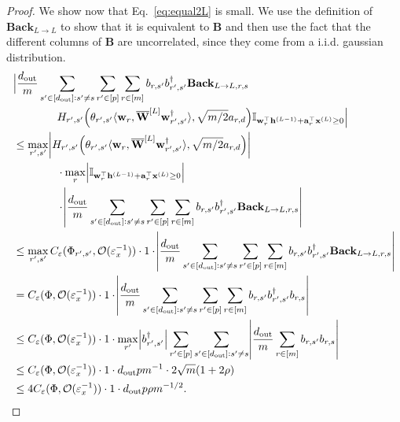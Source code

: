 \begin{proof}
			We show now that Eq.~\ref{eq:equal2L}  is small. We use the definition of $\mathbf{Back}_{L \to L}$ to show that it is equivalent to $\mathbf{B}$ and then use the fact that the different columns of $\mathbf{B}$ are uncorrelated, since they come from a i.i.d. gaussian distribution.
			\begingroup
			\allowdisplaybreaks
			\begin{align*}
				&\Big|\frac{\dout }{m}   \sum_{s' \in [\dout ]: s' \ne s} \sum_{r' \in [p]} \sum_{r \in [m]}  b_{r, s'} b_{r', s'}^{\dagger} \mathbf{Back}_{L \to L, r, s} \\& \quad \quad \quad \quad H_{r', s'}\Big(\theta_{r', s'} \langle \mathbf{w}_{r}, \overline{\mathbf{W}}^{[L]} \mathbf{w}_{r', s'}^{\dagger}\rangle , \sqrt{m/2} a_{r, d}\Big) \mathbb{I}_{\mathbf{w}_r^{\top} \mathbf{h}^{(L-1)} + \mathbf{a}_r^{\top} \mathbf{x}^{(L)} \ge 0}\Big|
				\\& \le \max_{r', s'} \abs{H_{r', s'}\Big(\theta_{r', s'} \langle \mathbf{w}_{r}, \overline{\mathbf{W}}^{[L]} \mathbf{w}_{r', s'}^{\dagger}\rangle , \sqrt{m/2} a_{r, d}\Big)} \\& \quad \quad \quad \quad 
				\cdot \max_r \abs{\mathbb{I}_{\mathbf{w}_r^{\top} \mathbf{h}^{(L-1)} + \mathbf{a}_r^{\top} \mathbf{x}^{(L)} \ge 0}}
				\\& \quad \quad \quad \quad \cdot \abs{\frac{\dout }{m}   \sum_{s' \in [\dout ]: s' \ne s} \sum_{r' \in [p]} \sum_{r \in [m]}  b_{r, s'} b_{r', s'}^{\dagger} \mathbf{Back}_{L \to L, r, s}}
				\\&\le \max_{r',s'} C_\varepsilon(\Phi_{r', s'}, \mathcal{O}( \varepsilon_x^{-1})) \cdot 1 \cdot \abs{\frac{\dout }{m}   \sum_{s' \in [\dout ]: s' \ne s} \sum_{r' \in [p]} \sum_{r \in [m]}  b_{r, s'} b_{r', s'}^{\dagger} \mathbf{Back}_{L \to L, r, s}} \\ &=
				C_\varepsilon(\Phi, \mathcal{O}( \varepsilon_x^{-1})) \cdot 1 \cdot \abs{\frac{\dout }{m}   \sum_{s' \in [\dout ]: s' \ne s} \sum_{r' \in [p]} \sum_{r \in [m]}  b_{r, s'} b_{r', s'}^{\dagger} b_{r, s}} \\&\le C_\varepsilon(\Phi, \mathcal{O}( \varepsilon_x^{-1})) \cdot 1 \cdot \max_{r'} \abs{b_{r', s'}^{\dagger}} \sum_{r' \in [p]} \sum_{s' \in [\dout ]: s' \ne s}  \abs{\frac{\dout }{m}    \sum_{r \in [m]}  b_{r, s'}  b_{r, s}} \\&
				\le C_\varepsilon(\Phi, \mathcal{O}( \varepsilon_x^{-1})) \cdot 1 \cdot \dout p m^{-1} \cdot 2\sqrt{m} (1 + 2\rho) \\&
				\le 4 C_\varepsilon(\Phi, \mathcal{O}( \varepsilon_x^{-1})) \cdot 1 \cdot \dout p \rho m^{-1/2}.

\end{align*}
\end{proof}
